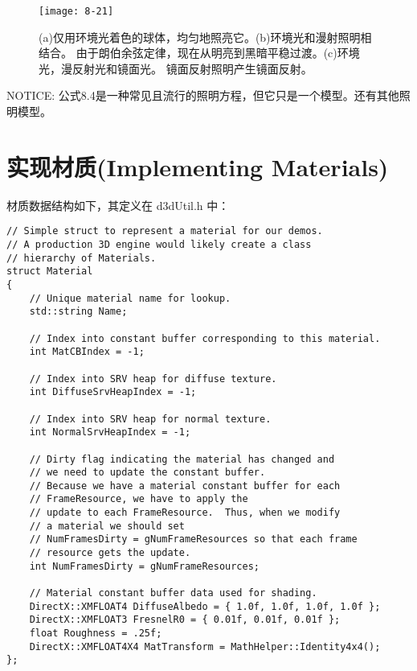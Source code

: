 \begin{figure}[h]
    \texttt{[image: 8-21]}
    \centering
    \caption{(a)仅用环境光着色的球体，均匀地照亮它。(b)环境光和漫射照明相结合。 由于朗伯余弦定律，现在从明亮到黑暗平稳过渡。(c)环境光，漫反射光和镜面光。 镜面反射照明产生镜面反射。}
    \label{fig:8-21}
\end{figure}

\begin{flushleft}
NOTICE: 公式8.4是一种常见且流行的照明方程，但它只是一个模型。还有其他照明模型。
\end{flushleft}

\section{实现材质(Implementing Materials)}
\begin{flushleft}
材质数据结构如下，其定义在 d3dUtil.h 中：\\
\end{flushleft}

\begin{lstlisting}
// Simple struct to represent a material for our demos.  
// A production 3D engine would likely create a class 
// hierarchy of Materials.
struct Material
{
    // Unique material name for lookup.
    std::string Name;

    // Index into constant buffer corresponding to this material.
    int MatCBIndex = -1;

    // Index into SRV heap for diffuse texture.
    int DiffuseSrvHeapIndex = -1;

    // Index into SRV heap for normal texture.
    int NormalSrvHeapIndex = -1;

    // Dirty flag indicating the material has changed and
    // we need to update the constant buffer.
    // Because we have a material constant buffer for each 
    // FrameResource, we have to apply the
    // update to each FrameResource.  Thus, when we modify 
    // a material we should set 
    // NumFramesDirty = gNumFrameResources so that each frame 
    // resource gets the update.
    int NumFramesDirty = gNumFrameResources;

    // Material constant buffer data used for shading.
    DirectX::XMFLOAT4 DiffuseAlbedo = { 1.0f, 1.0f, 1.0f, 1.0f };
    DirectX::XMFLOAT3 FresnelR0 = { 0.01f, 0.01f, 0.01f };
    float Roughness = .25f;
    DirectX::XMFLOAT4X4 MatTransform = MathHelper::Identity4x4();
};
\end{lstlisting}

